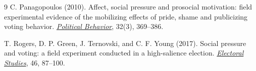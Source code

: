 \documentclass[a4paper,12pt]{article}
\begin{document}
\begin{thebibliography}{9}
C. Panagopoulos (2010).
\newblock Affect, social pressure and prosocial motivation: field experimental evidence of the mobilizing effects of pride, shame and publicizing voting behavior.
\newblock \href{https://doi.org/10.1007/s11109-010-9114-0}{\emph{Political Behavior}}, 32(3), 369--386.

T. Rogers, D. P. Green, J. Ternovski, and C. F. Young (2017).
\newblock Social pressure and voting: a field experiment conducted in a high-salience election.
\newblock \href{https://doi.org/10.1016/j.electstud.2017.02.004}{\emph{Electoral Studies}}, 46, 87--100.

\end{thebibliography}
\end{document}
